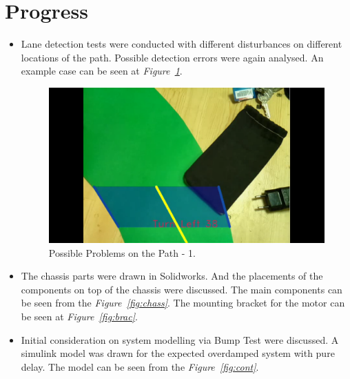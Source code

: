 \documentclass[a4paper,12pt]{article}
\begin{document}
\section{Progress}
\begin{itemize}
	\item Lane detection tests were conducted with different disturbances on different locations of the path. Possible detection errors were again analysed. An example case can be seen at \textit{Figure~\ref{fig:lane-analysis-1}}.

		\begin{figure}[H]
			\center
			\setlength{\unitlength}{\textwidth} 
			\includegraphics[width=0.75\unitlength]{lane_det}
			\caption{\label{fig:lane-analysis-1} Possible Problems on the Path - 1.}
		\end{figure}
			
	 \item The chassis parts were drawn in Solidworks. And the placements of the components on top of the chassis were discussed. The main components can be seen from the \textit{Figure~\ref{fig:chass}}. The mounting bracket for the motor can be seen at \textit{Figure~\ref{fig:brac}}. 
	 
	 \item Initial consideration on system modelling via Bump Test were discussed. A simulink model was drawn for the expected overdamped system with pure delay. The model can be seen from the \textit{Figure~\ref{fig:cont}}.  
    

\end{itemize}
\end{document}
